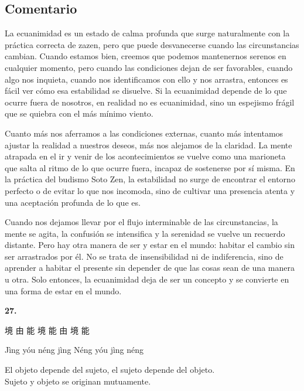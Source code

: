 \documentclass[
  a5paperpaper,
]{article}
\begin{document}
\hfill\break

\hypertarget{comentario-25}{%
\subsection{Comentario}\label{comentario-25}}

La ecuanimidad es un estado de calma profunda que surge naturalmente con
la práctica correcta de zazen, pero que puede desvanecerse cuando las
circunstancias cambian. Cuando estamos bien, creemos que podemos
mantenernos serenos en cualquier momento, pero cuando las condiciones
dejan de ser favorables, cuando algo nos inquieta, cuando nos
identificamos con ello y nos arrastra, entonces es fácil ver cómo esa
estabilidad se disuelve. Si la ecuanimidad depende de lo que ocurre
fuera de nosotros, en realidad no es ecuanimidad, sino un espejismo
frágil que se quiebra con el más mínimo viento.

Cuanto más nos aferramos a las condiciones externas, cuanto más
intentamos ajustar la realidad a nuestros deseos, más nos alejamos de la
claridad. La mente atrapada en el ir y venir de los acontecimientos se
vuelve como una marioneta que salta al ritmo de lo que ocurre fuera,
incapaz de sostenerse por sí misma. En la práctica del budismo Soto Zen,
la estabilidad no surge de encontrar el entorno perfecto o de evitar lo
que nos incomoda, sino de cultivar una presencia atenta y una aceptación
profunda de lo que es.

Cuando nos dejamos llevar por el flujo interminable de las
circunstancias, la mente se agita, la confusión se intensifica y la
serenidad se vuelve un recuerdo distante. Pero hay otra manera de ser y
estar en el mundo: habitar el cambio sin ser arrastrados por él. No se
trata de insensibilidad ni de indiferencia, sino de aprender a habitar
el presente sin depender de que las cosas sean de una manera u otra.
Solo entonces, la ecuanimidad deja de ser un concepto y se convierte en
una forma de estar en el mundo.

\hfill\break

\hypertarget{02}{}
\begin{verseblock}

\newpage

\begin{center}\textbf{27.}\end{center}

境 由 能 境 能 由 境 能

Jìng yóu néng jìng Néng yóu jìng néng

El objeto depende del sujeto, el sujeto depende del objeto.\\
Sujeto y objeto se originan mutuamente.

\end{verseblock}
\end{document}
